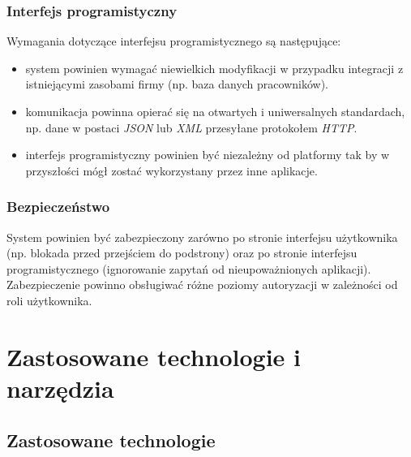 \documentclass[eng,printmode,openany]{mgr}
\begin{document}
	\subsection{Interfejs programistyczny}
	Wymagania dotyczące interfejsu programistycznego są następujące:
	\begin{itemize}
		\item system powinien wymagać niewielkich modyfikacji w przypadku integracji z istniejącymi zasobami firmy (np. baza danych pracowników).
		\item komunikacja powinna opierać się na otwartych i uniwersalnych standardach, np. dane w postaci \textit{JSON} lub \textit{XML} przesyłane protokołem \textit{HTTP}.
		\item interfejs programistyczny powinien być niezależny od platformy tak by w przyszłości mógł zostać wykorzystany przez inne aplikacje.
	\end{itemize}
	\subsection{Bezpieczeństwo}
	System powinien być zabezpieczony zarówno po stronie interfejsu użytkownika (np. blokada przed przejściem do podstrony) oraz po stronie interfejsu programistycznego (ignorowanie zapytań od nieupoważnionych aplikacji). Zabezpieczenie powinno obsługiwać różne poziomy autoryzacji w zależności od roli użytkownika.
	
	\newpage
	\chapter{Zastosowane technologie i narzędzia}
	\section{Zastosowane technologie}
\end{document}
